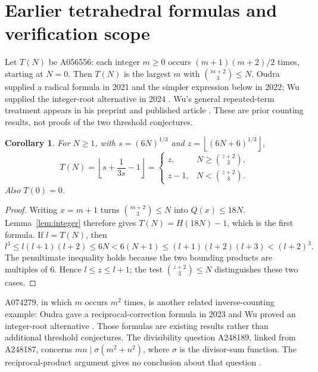 \documentclass[11pt]{article}
\newtheorem{corollary}[theorem]{Corollary}
\newcommand{\floor}[1]{\left\lfloor #1\right\rfloor}
\begin{document}
\section{Earlier tetrahedral formulas and verification scope}
Let $T(N)$ be A056556: each integer $m\geq0$ occurs
$(m+1)(m+2)/2$ times, starting at $N=0$. Then $T(N)$ is the
largest $m$ with $\binom{m+2}{3}\leq N$. Oudra supplied a radical
formula in 2021 and the simpler expression below in 2022;
Wu supplied the integer-root alternative in 2024 \cite{tetrahedral}.
Wu's general repeated-term treatment appears in his preprint and
published article \cite[Section 4, p.~22]{wu}. These are prior
counting results, not proofs of the two threshold conjectures.

\begin{corollary}\label{cor:tetrahedral}
For $N\geq1$, with $s=(6N)^{1/3}$ and $z=\floor{(6N+6)^{1/3}}$,
\[
 T(N)=\floor{s+\frac1{3s}-1}
 =\begin{cases}
 z,&N\geq\binom{z+2}{3},\\
 z-1,&N<\binom{z+2}{3}.
 \end{cases}
\]
Also $T(0)=0$.
\end{corollary}
\begin{proof}
Writing $x=m+1$ turns $\binom{m+2}{3}\leq N$ into
$Q(x)\leq18N$. Lemma~\ref{lem:integer} therefore gives
$T(N)=H(18N)-1$, which is the first formula.
If $l=T(N)$, then
\[
 l^3\leq l(l+1)(l+2)\leq6N<6(N+1)
 \leq(l+1)(l+2)(l+3)<(l+2)^3.
\]
The penultimate inequality holds because the two bounding products
are multiples of $6$. Hence $l\leq z\leq l+1$; the test
$\binom{z+2}{3}\leq N$ distinguishes these two cases.
\end{proof}

A074279, in which $m$ occurs $m^2$ times, is another related
inverse-counting example: Oudra gave a reciprocal-correction formula
in 2023 and Wu proved an integer-root alternative
\cite{squareblocks,wu}. Those formulas are existing results rather
than additional threshold conjectures. The divisibility question
A248189, linked from A248187, concerns $mn\mid\sigma(m^2+n^2)$,
where $\sigma$ is the divisor-sum function. The reciprocal-product
argument gives no conclusion about that question \cite{unrelated}.
\end{document}
